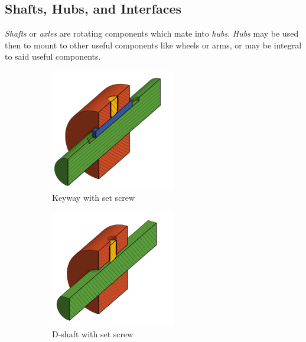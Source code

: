\documentclass[10pt,letterpaper]{book}
\begin{document}
\subsection{Shafts, Hubs, and Interfaces}
	
	\textit{Shafts} or \textit{axles} are rotating components which mate into \textit{hubs}. \textit{Hubs} may be used then to mount to other useful components like wheels or arms, or may be integral to said useful components.

	\begin{figure}[H]
		\centering
		\begin{subfigure}[b]{.32\linewidth}
			\includegraphics[width=0.6\textwidth]{imgs/keyedshaft.png}
			\caption{Keyway with set screw}
		\end{subfigure}
		\begin{subfigure}[b]{.32\linewidth}
			\includegraphics[width=0.6\textwidth]{imgs/dshaft.png}
			\caption{D-shaft with set screw}
		\end{subfigure}
		\begin{subfigure}[b]{.32\linewidth}

\end{subfigure}
\end{figure}
\end{document}
